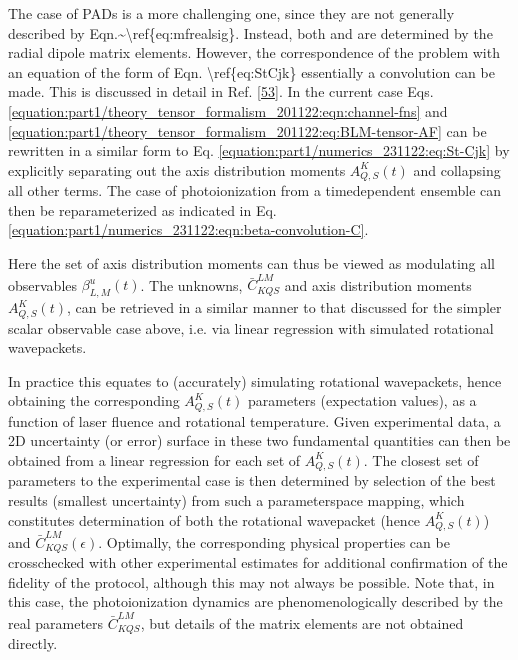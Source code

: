 \documentclass[letterpaper,table,10pt,english]{jupyterBook}
\begin{document}
\sphinxAtStartPar
The case of PADs is a more challenging one, since they are not generally described by Eqn.\textasciitilde{}\textbackslash{}ref\{eq:mfrealsig\}. Instead, both {\hyperref[\detokenize{backmatter/glossary:term-AF}]{}} and {\hyperref[\detokenize{backmatter/glossary:term-MF}]{}} {\hyperref[\detokenize{backmatter/glossary:term-PADs}]{}} are determined by the radial dipole matrix elements. However, the correspondence of the problem with an equation of the form of Eqn. \textbackslash{}ref\{eq:St\sphinxhyphen{}Cjk\} \sphinxhyphen{} essentially a convolution \sphinxhyphen{} can be made. This is discussed in detail in Ref. {[}\hyperlink{cite.backmatter/bibliography:id842}{53}{]}. In the current case Eqs. \eqref{equation:part1/theory_tensor_formalism_201122:eqn:channel-fns} and \eqref{equation:part1/theory_tensor_formalism_201122:eq:BLM-tensor-AF} can be rewritten in a similar form to Eq. \eqref{equation:part1/numerics_231122:eq:St-Cjk} by explicitly separating out the axis distribution moments \(A_{Q,S}^{K}(t)\) and collapsing all other terms. The case of photoionization from a time\sphinxhyphen{}dependent ensemble can then be reparameterized as indicated in Eq. \eqref{equation:part1/numerics_231122:eqn:beta-convolution-C}.

\sphinxAtStartPar
Here the set of axis distribution moments can thus be viewed as modulating all observables \(\beta_{L,M}^{u}(t)\). The unknowns, \(\bar{C}_{KQS}^{LM}\) and axis distribution moments \(A_{Q,S}^{K}(t)\), can be retrieved in a similar manner to that discussed for the simpler scalar observable case above, i.e. via linear regression with simulated rotational wavepackets.

\sphinxAtStartPar
In practice this equates to (accurately) simulating rotational wavepackets, hence obtaining the corresponding \(A_{Q,S}^{K}(t)\) parameters (expectation values), as a function of laser fluence and rotational temperature. Given experimental data, a 2D uncertainty (or error) surface in these two fundamental quantities can then be obtained from a linear regression for each set of \(A_{Q,S}^{K}(t)\). The closest set of parameters to the experimental case is then determined by selection of the best results (smallest uncertainty) from such a parameter\sphinxhyphen{}space mapping, which constitutes determination of both the rotational wavepacket (hence \(A_{Q,S}^{K}(t)\)) and \(\bar{C}_{KQS}^{LM}(\epsilon)\). Optimally, the corresponding physical properties can be cross\sphinxhyphen{}checked with other experimental estimates for additional confirmation of the fidelity of the protocol, although this may not always be possible. Note that, in this case, the photoionization dynamics are phenomenologically described by the real parameters \(\bar{C}_{KQS}^{LM}\), but details of the matrix elements are not obtained directly.
\end{document}
